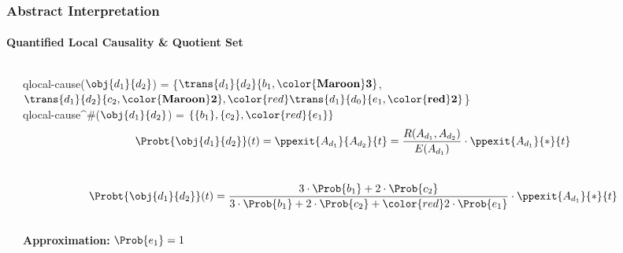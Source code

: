 \begin{frame}
\frametitle{Abstract Interpretation}
\framesubtitle{Quantified Local Causality \& Quotient Set}
\begin{columns}
\begin{column}{0.25\textwidth}
\begin{left}\scalebox{\scaleex}{
\begin{tikzpicture}
\exsanaidef
\end{tikzpicture}
}\end{left}
\end{column}
\begin{column}[c]{0.75\textwidth}

qlocal-cause($\obj{d_1}{d_2}$) = \{$\trans{d_1}{d_2}{b_1,\mathbf{\color{Maroon} 3}}$, $\trans{d_1}{d_2}{c_2,\mathbf{\color{Maroon} 2}},
{\color{red} \trans{d_1}{d_0}{e_1,\mathbf{\color{red} 2}}}$\}\\
\medskip
qlocal-cause^\#($\obj{d_1}{d_2}$) = $\{\{b_1\},\{c_2\},{\color{red}\{e_1\}}\}$ \\

$$\Probt{\obj{d_1}{d_2}}(t) =\ppexit{A_{d_1}}{A_{d_2}}{t}= \frac{R (A_{d_1},A_{d_2})}{E (A_{d_1})} \cdot \ppexit{A_{d_1}}{*}{t} $$ \\

$$\Probt{\obj{d_1}{d_2}}(t) = \frac{3 \cdot \Prob{b_1} + 2 \cdot \Prob{c_2}}{3 \cdot \Prob{b_1} + 2 \cdot \Prob{c_2}+ {\color{red} 2 \cdot \Prob{e_1}}}\cdot \ppexit{A_{d_1}}{*}{t}$$ \\

\textbf{Approximation:} {\color{red} $\Prob{e_1} = 1$}


\end{column}
\end{columns}


\end{frame}
